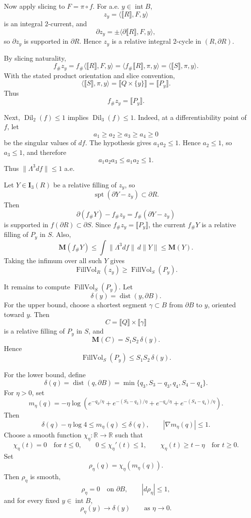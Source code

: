 \documentclass[12pt]{article}
\begin{document}
Now apply slicing to \(F=\pi\circ f\). For a.e. \(y\in\operatorname{int}B\),
\[
z_y=\langle \llbracket R\rrbracket,F,y\rangle
\]
is an integral \(2\)-current, and
\[
\partial z_y
=
\pm \langle \partial\llbracket R\rrbracket,F,y\rangle,
\]
so \(\partial z_y\) is supported in \(\partial R\). Hence \(z_y\) is a relative integral \(2\)-cycle in \((R,\partial R)\).

By slicing naturality,
\[
f_\# z_y
=
f_\#\langle \llbracket R\rrbracket,F,y\rangle
=
\langle f_\#\llbracket R\rrbracket,\pi,y\rangle
=
\langle \llbracket S\rrbracket,\pi,y\rangle .
\]
With the stated product orientation and slice convention,
\[
\langle \llbracket S\rrbracket,\pi,y\rangle
=
\llbracket Q\times\{y\}\rrbracket
=
\llbracket P_y\rrbracket.
\]
Thus
\[
f_\#z_y=\llbracket P_y\rrbracket.
\]

Next, \(\operatorname{Dil}_2(f)\le 1\) implies \(\operatorname{Dil}_3(f)\le 1\). Indeed, at a differentiability point of \(f\), let
\[
a_1\ge a_2\ge a_3\ge a_4\ge 0
\]
be the singular values of \(df\). The hypothesis gives \(a_1a_2\le 1\). Hence \(a_2\le 1\), so \(a_3\le 1\), and therefore
\[
a_1a_2a_3\le a_1a_2\le 1.
\]
Thus \(\|\Lambda^3df\|\le 1\) a.e.

Let \(Y\in \mathbf I_3(R)\) be a relative filling of \(z_y\), so
\[
\operatorname{spt}(\partial Y-z_y)\subset \partial R.
\]
Then
\[
\partial(f_\#Y)-f_\#z_y
=
f_\#(\partial Y-z_y)
\]
is supported in \(f(\partial R)\subset \partial S\). Since \(f_\#z_y=\llbracket P_y\rrbracket\), the current \(f_\#Y\) is a relative filling of \(P_y\) in \(S\). Also,
\[
\mathbf M(f_\#Y)\le \int \|\Lambda^3df\|\,d\|Y\|\le \mathbf M(Y).
\]
Taking the infimum over all such \(Y\) gives
\[
\operatorname{FillVol}_R(z_y)\ge \operatorname{FillVol}_S(P_y).
\]

It remains to compute \(\operatorname{FillVol}_S(P_y)\). Let
\[
\delta(y)=\operatorname{dist}(y,\partial B).
\]
For the upper bound, choose a shortest segment \(\gamma\subset B\) from \(\partial B\) to \(y\), oriented toward \(y\). Then
\[
C=\llbracket Q\rrbracket\times \llbracket \gamma\rrbracket
\]
is a relative filling of \(P_y\) in \(S\), and
\[
\mathbf M(C)=S_1S_2\,\delta(y).
\]
Hence
\[
\operatorname{FillVol}_S(P_y)\le S_1S_2\,\delta(y).
\]

For the lower bound, define
\[
\delta(q)=\operatorname{dist}(q,\partial B)
=
\min\{q_3,S_3-q_3,q_4,S_4-q_4\}.
\]
For \(\eta>0\), set
\[
m_\eta(q)
=
-\eta\log\left(
e^{-q_3/\eta}
+
e^{-(S_3-q_3)/\eta}
+
e^{-q_4/\eta}
+
e^{-(S_4-q_4)/\eta}
\right).
\]
Then
\[
\delta(q)-\eta\log 4\le m_\eta(q)\le \delta(q),
\qquad
|\nabla m_\eta(q)|\le 1.
\]
Choose a smooth function \(\chi_\eta:\mathbb R\to\mathbb R\) such that
\[
\chi_\eta(t)=0\quad\text{for }t\le 0,\qquad
0\le \chi_\eta'(t)\le 1,\qquad
\chi_\eta(t)\ge t-\eta\quad\text{for }t\ge 0.
\]
Set
\[
\rho_\eta(q)=\chi_\eta(m_\eta(q)).
\]
Then \(\rho_\eta\) is smooth,
\[
\rho_\eta=0\quad\text{on }\partial B,\qquad |d\rho_\eta|\le 1,
\]
and for every fixed \(y\in\operatorname{int}B\),
\[
\rho_\eta(y)\to \delta(y)
\qquad\text{as }\eta\to 0.
\]
\end{document}

